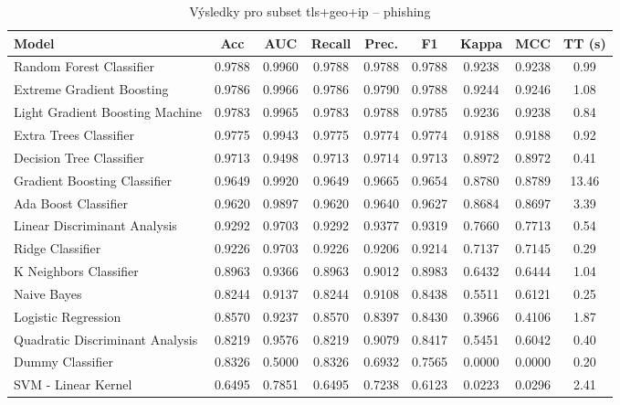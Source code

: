 \begin{table}[H]
  \centering
  \small
  \caption{Výsledky pro subset tls+geo+ip – phishing}
  \begin{tabular}{|l|c|c|c|c|c|c|c|c|}
    \hline
    \textbf{Model} & \textbf{Acc} & \textbf{AUC} & \textbf{Recall} & \textbf{Prec.} & \textbf{F1} & \textbf{Kappa} & \textbf{MCC} & \textbf{TT (s)} \\
    \hline
    Random Forest Classifier & 0.9788 & 0.9960 & 0.9788 & 0.9788 & 0.9788 & 0.9238 & 0.9238 & 0.99 \\
    Extreme Gradient Boosting & 0.9786 & 0.9966 & 0.9786 & 0.9790 & 0.9788 & 0.9244 & 0.9246 & 1.08 \\
    Light Gradient Boosting Machine & 0.9783 & 0.9965 & 0.9783 & 0.9788 & 0.9785 & 0.9236 & 0.9238 & 0.84 \\
    Extra Trees Classifier & 0.9775 & 0.9943 & 0.9775 & 0.9774 & 0.9774 & 0.9188 & 0.9188 & 0.92 \\
    Decision Tree Classifier & 0.9713 & 0.9498 & 0.9713 & 0.9714 & 0.9713 & 0.8972 & 0.8972 & 0.41 \\
    Gradient Boosting Classifier & 0.9649 & 0.9920 & 0.9649 & 0.9665 & 0.9654 & 0.8780 & 0.8789 & 13.46 \\
    Ada Boost Classifier & 0.9620 & 0.9897 & 0.9620 & 0.9640 & 0.9627 & 0.8684 & 0.8697 & 3.39 \\
    Linear Discriminant Analysis & 0.9292 & 0.9703 & 0.9292 & 0.9377 & 0.9319 & 0.7660 & 0.7713 & 0.54 \\
    Ridge Classifier & 0.9226 & 0.9703 & 0.9226 & 0.9206 & 0.9214 & 0.7137 & 0.7145 & 0.29 \\
    K Neighbors Classifier & 0.8963 & 0.9366 & 0.8963 & 0.9012 & 0.8983 & 0.6432 & 0.6444 & 1.04 \\
    Naive Bayes & 0.8244 & 0.9137 & 0.8244 & 0.9108 & 0.8438 & 0.5511 & 0.6121 & 0.25 \\
    Logistic Regression & 0.8570 & 0.9237 & 0.8570 & 0.8397 & 0.8430 & 0.3966 & 0.4106 & 1.87 \\
    Quadratic Discriminant Analysis & 0.8219 & 0.9576 & 0.8219 & 0.9079 & 0.8417 & 0.5451 & 0.6042 & 0.40 \\
    Dummy Classifier & 0.8326 & 0.5000 & 0.8326 & 0.6932 & 0.7565 & 0.0000 & 0.0000 & 0.20 \\
    SVM - Linear Kernel & 0.6495 & 0.7851 & 0.6495 & 0.7238 & 0.6123 & 0.0223 & 0.0296 & 2.41 \\
    \hline
  \end{tabular}
\end{table}
\vspace{0.5cm}

